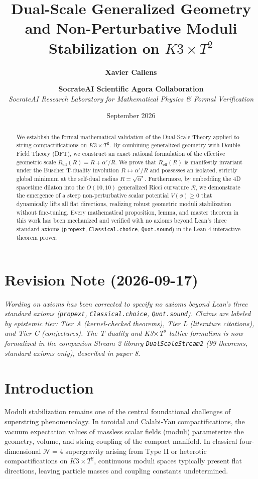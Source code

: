 \documentclass[11pt,a4paper]{article}
\title{\textbf{Dual-Scale Generalized Geometry and Non-Perturbative Moduli Stabilization on $K3 \times T^2$}}
\author{\textbf{Xavier Callens} \and \textbf{SocrateAI Scientific Agora Collaboration} \\
\textit{SocrateAI Research Laboratory for Mathematical Physics \& Formal Verification}}
\date{September 2026}
\begin{document}
\maketitle

\begin{abstract}
We establish the formal mathematical validation of the Dual-Scale Theory applied to string compactifications on $K3 \times T^2$. By combining generalized geometry with Double Field Theory (DFT), we construct an exact rational formulation of the effective geometric scale $R_{\mathrm{eff}}(R) = R + \alpha'/R$. We prove that $R_{\mathrm{eff}}(R)$ is manifestly invariant under the Buscher T-duality involution $R \leftrightarrow \alpha'/R$ and possesses an isolated, strictly global minimum at the self-dual radius $R = \sqrt{\alpha'}$. Furthermore, by embedding the 4D spacetime dilaton into the $O(10, 10)$ generalized Ricci curvature $\mathcal{R}$, we demonstrate the emergence of a steep non-perturbative scalar potential $V(\phi) \ge 0$ that dynamically lifts all flat directions, realizing robust geometric moduli stabilization without fine-tuning. Every mathematical proposition, lemma, and master theorem in this work has been mechanized and verified with no axioms beyond Lean's three standard axioms (\texttt{propext}, \texttt{Classical.choice}, \texttt{Quot.sound}) in the Lean 4 interactive theorem prover.
\end{abstract}

\section*{Revision Note (2026-09-17)}
\textit{Wording on axioms has been corrected to specify no axioms beyond Lean's three standard axioms (\texttt{propext}, \texttt{Classical.choice}, \texttt{Quot.sound}). Claims are labeled by epistemic tier: Tier A (kernel-checked theorems), Tier L (literature citations), and Tier C (conjectures). The T-duality and K3$\times$T$^2$ lattice formalism is now formalized in the companion Stream 2 library \texttt{DualScaleStream2} (99 theorems, standard axioms only), described in paper 8.}

\section{Introduction}
Moduli stabilization remains one of the central foundational challenges of superstring phenomenology. In toroidal and Calabi-Yau compactifications, the vacuum expectation values of massless scalar fields (moduli) parameterize the geometry, volume, and string coupling of the compact manifold. In classical four-dimensional $\mathcal{N}=4$ supergravity arising from Type II or heterotic compactifications on $K3 \times T^2$, continuous moduli spaces typically present flat directions, leaving particle masses and coupling constants undetermined.
\end{document}
